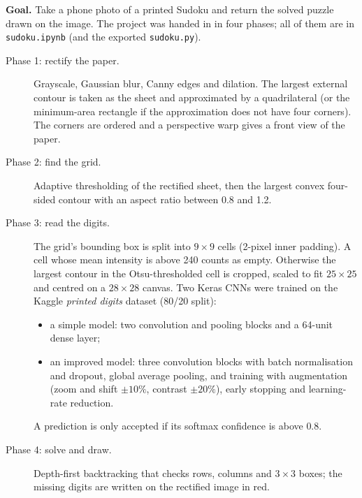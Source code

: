 


\textbf{Goal.} Take a phone photo of a printed Sudoku and return the solved puzzle drawn on the image. The project was handed in in four phases; all of them are in \texttt{sudoku.ipynb} (and the exported \texttt{sudoku.py}).

\begin{description}
  \item[Phase 1: rectify the paper.] Grayscale, Gaussian blur, Canny edges and dilation. The largest external contour is taken as the sheet and approximated by a quadrilateral (or the minimum-area rectangle if the approximation does not have four corners). The corners are ordered and a perspective warp gives a front view of the paper.
  \item[Phase 2: find the grid.] Adaptive thresholding of the rectified sheet, then the largest convex four-sided contour with an aspect ratio between 0.8 and 1.2.
  \item[Phase 3: read the digits.] The grid's bounding box is split into $9\times9$ cells (2-pixel inner padding). A cell whose mean intensity is above 240 counts as empty. Otherwise the largest contour in the Otsu-thresholded cell is cropped, scaled to fit $25\times25$ and centred on a $28\times28$ canvas. Two Keras CNNs were trained on the Kaggle \emph{printed digits} dataset (80/20 split):
  \begin{itemize}
    \item a simple model: two convolution and pooling blocks and a 64-unit dense layer;
    \item an improved model: three convolution blocks with batch normalisation and dropout, global average pooling, and training with augmentation (zoom and shift $\pm10\%$, contrast $\pm20\%$), early stopping and learning-rate reduction.
  \end{itemize}
  A prediction is only accepted if its softmax confidence is above $0.8$.
  \item[Phase 4: solve and draw.] Depth-first backtracking that checks rows, columns and $3\times3$ boxes; the missing digits are written on the rectified image in red.
\end{description}


